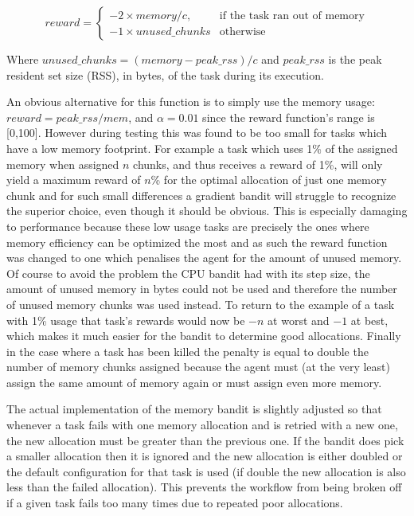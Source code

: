 \[ reward = 
\begin{cases}
    -2\times memory/c,& \text{if the task ran out of memory}\\
    -1 \times unused\_chunks              & \text{otherwise}
\end{cases}
\]

Where $unused\_chunks = (memory - peak\_rss) / c$ and $peak\_rss$ is the peak resident set size (RSS), in bytes, of the task during its execution.

An obvious alternative for this function is to simply use the memory usage: $reward = peak\_rss/mem$, and $\alpha = 0.01$ since the reward function’s range is [0,100]. However during testing this was found to be too small for tasks which have a low memory footprint. For example a task which uses 1\% of the assigned memory when assigned $n$ chunks, and thus receives a reward of 1\%, will only yield a maximum reward of $n$\% for the optimal allocation of just one memory chunk and for such small differences a gradient bandit will struggle to recognize the superior choice, even though it should be obvious. This is especially damaging to performance because these low usage tasks are precisely the ones where memory efficiency can be optimized the most and as such the reward function was changed to one which penalises the agent for the amount of unused memory. Of course to avoid the problem the CPU bandit had with its step size, the amount of unused memory in bytes could not be used and therefore the number of unused memory chunks was used instead. To return to the example of a task with 1\% usage that task’s rewards would now be $-n$ at worst and $-1$ at best, which makes it much easier for the bandit to determine good allocations. Finally in the case where a task has been killed the penalty is equal to double the number of memory chunks assigned because the agent must (at the very least) assign the same amount of memory again or must assign even more memory.

The actual implementation of the memory bandit is slightly adjusted so that whenever a task fails with one memory allocation and is retried with a new one, the new allocation must be greater than the previous one. If the bandit does pick a smaller allocation then it is ignored and the new allocation is either doubled or the default configuration for that task is used (if double the new allocation is also less than the failed allocation). This prevents the workflow from being broken off if a given task fails too many times due to repeated poor allocations.

